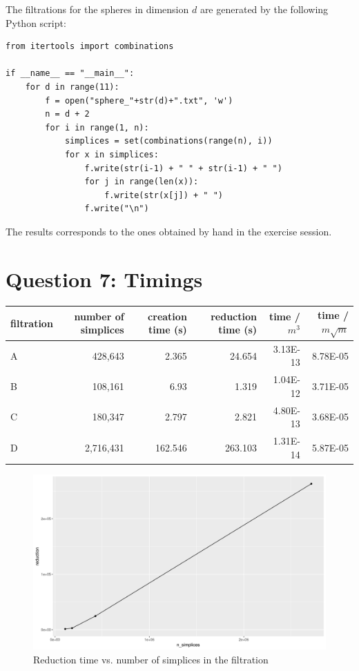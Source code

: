 \documentclass[a4paper,11pt,openany,extrafontsizes,oneside,article]{memoir}
\begin{document}
The filtrations for the spheres in dimension $d$ are generated by the
following Python script:

\begin{verbatim}
from itertools import combinations

if __name__ == "__main__":
    for d in range(11):
        f = open("sphere_"+str(d)+".txt", 'w')
        n = d + 2
        for i in range(1, n):
            simplices = set(combinations(range(n), i))
            for x in simplices:
                f.write(str(i-1) + " " + str(i-1) + " ")
                for j in range(len(x)):
                    f.write(str(x[j]) + " ")
                f.write("\n")
\end{verbatim}

The results corresponds to the ones obtained by hand in the exercise
session.


\chapter{Question 7: Timings}
\label{chap:q7}

\begin{tabular}{lrrrrr}
  filtration & number of simplices & creation time (s) & reduction time (s)
  & time / $m^3$ & time / $m\sqrt{m}$\\
  \hline
  A & 428,643 & 2.365 & 24.654 & 3.13E-13 & 8.78E-05 \\
  B & 108,161 & 6.93 & 1.319 & 1.04E-12 & 3.71E-05 \\
  C & 180,347 & 2.797 & 2.821 & 4.80E-13 & 3.68E-05 \\
  D & 2,716,431 & 162.546 & 263.103 & 1.31E-14 & 5.87E-05 \\
\end{tabular}

\begin{figure}[ht]
  \centering
  \includegraphics[width=\linewidth]{timings.png}
  \caption{Reduction time vs. number of simplices in the filtration}
  \label{fig:timings}
\end{figure}
\end{document}

